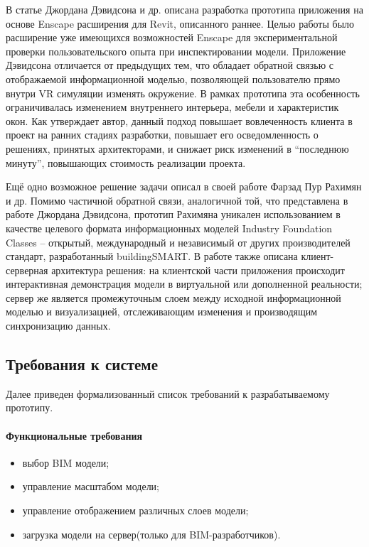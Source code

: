 В статье Джордана Дэвидсона и др. описана разработка прототипа приложения
на основе Enscape расширения для Revit, описанного раннее.
\cite{Davidson2019}
Целью работы было расширение уже имеющихся возможностей Enscape
для экспериментальной проверки пользовательского опыта при инспектировании модели.
Приложение Дэвидсона отличается от предыдущих тем,
что обладает обратной связью с отображаемой информационной моделью,
позволяющей пользователю прямо внутри VR симуляции изменять окружение.
В рамках прототипа эта особенность ограничивалась изменением
внутреннего интерьера, мебели и характеристик окон.
Как утверждает автор, данный подход повышает вовлеченность
клиента в проект на ранних стадиях разработки,
повышает его осведомленность о решениях, принятых архитекторами,
и снижает риск изменений в ``последнюю минуту'',
повышающих стоимость реализации проекта.

Ещё одно возможное решение задачи описал в своей работе Фарзад Пур Рахимян и др.
\cite{PourRahimian2019}
Помимо частичной обратной связи, аналогичной той,
что представлена в работе Джордана Дэвидсона,
прототип Рахимяна уникален использованием в качестве целевого формата информационных моделей
Industry Foundation Classes -- открытый, международный и
независимый от других производителей стандарт,
разработанный buildingSMART.
\cite{BuildingSmartIFC}
В работе также описана клиент-серверная архитектура решения:
на клиентской части приложения происходит интерактивная демонстрация модели
в виртуальной или дополненной реальности;
сервер же является промежуточным слоем между исходной информационной моделью и визуализацией,
отслеживающим изменения и производящим синхронизацию данных.


\subsection{Требования к системе}

Далее приведен формализованный список требований к разрабатываемому прототипу.

\paragraph{Функциональные требования}
\begin{itemize}
    \item выбор BIM модели;
    \item управление масштабом модели;
    \item управление отображением различных слоев модели;
    \item загрузка модели на сервер(только для BIM-разработчиков).
\end{itemize}

